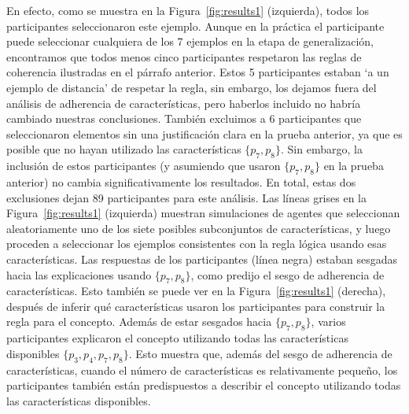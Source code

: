En efecto, como se muestra en la Figura~\ref{fig:results1} (izquierda), todos los participantes seleccionaron este ejemplo. Aunque en la práctica el participante puede seleccionar cualquiera de los 7 ejemplos en la etapa de generalización, encontramos que todos menos cinco participantes respetaron las reglas de coherencia ilustradas en el párrafo anterior. Estos 5 participantes estaban `a un ejemplo de distancia' de respetar la regla, sin embargo, los dejamos fuera del análisis de adherencia de características, pero haberlos incluido no habría cambiado nuestras conclusiones. También excluimos a 6 participantes que seleccionaron elementos sin una justificación clara en la prueba anterior, ya que es posible que no hayan utilizado las características $ \{p_7, p_8 \} $. Sin embargo, la inclusión de estos participantes (y asumiendo que usaron $ \{p_7, p_8 \} $ en la prueba anterior) no cambia significativamente los resultados. En total, estas dos exclusiones dejan 89 participantes para este análisis. Las líneas grises en la Figura~\ref{fig:results1} (izquierda) muestran simulaciones de agentes que seleccionan aleatoriamente uno de los siete posibles subconjuntos de características, y luego proceden a seleccionar los ejemplos consistentes con la regla lógica usando esas características. Las respuestas de los participantes (línea negra) estaban sesgadas hacia las explicaciones usando $ \{p_7, p_8 \} $, como predijo el sesgo de adherencia de características. Esto también se puede ver en la Figura~\ref{fig:results1} (derecha), después de inferir qué características usaron los participantes para construir la regla para el concepto. Además de estar sesgados hacia $ \{p_7, p_8 \}$, varios participantes explicaron el concepto utilizando todas las características disponibles $ \{p_3, p_4, p_7, p_8 \} $. Esto muestra que, además del sesgo de adherencia de características, cuando el número de características es relativamente pequeño, los participantes también están predispuestos a describir el concepto utilizando todas las características disponibles.


